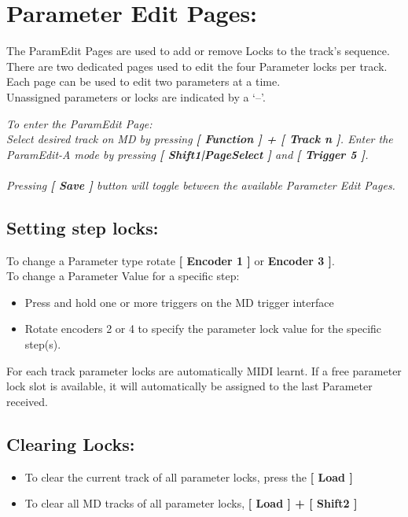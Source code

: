 \chapter{Parameter Edit Pages:}
The ParamEdit Pages are used to add or remove Locks to the track’s sequence.
\\

There are two dedicated pages used to edit the four Parameter locks per track.\\
Each page can be used to edit two parameters at a time.
\\

Unassigned parameters or locks are indicated by a ‘--’.


\textit{To enter the ParamEdit Page:\\ Select desired track on MD by pressing \textbf{[ Function ] + [ Track n ]}. Enter the ParamEdit-A mode by pressing \textbf{[ Shift1|PageSelect ]} and \textbf{[ Trigger 5 ]}.}
\\\\
\textit{Pressing \textbf{[ Save ]} button will toggle between the available Parameter Edit Pages.}


\section{Setting step locks:}
To change a Parameter type rotate \textbf{[ Encoder 1 ]} or \textbf{ Encoder 3 ]}.\\
To change a Parameter Value for a specific step:
\begin{itemize}
\item Press and hold one or more triggers on the MD trigger interface
\item Rotate encoders 2 or 4 to specify the parameter lock value for the specific step(s).
\end{itemize}
For each track parameter locks are automatically MIDI learnt. If a free parameter lock slot is available, it will automatically be assigned to the last Parameter received. 
\section{Clearing Locks:}
\begin{itemize}
\item To clear the current track of all parameter locks, press the \textbf{[ Load  ]}
\item To clear all MD tracks of all parameter locks, \textbf{[ Load ] + [ Shift2 ]}
\end{itemize}